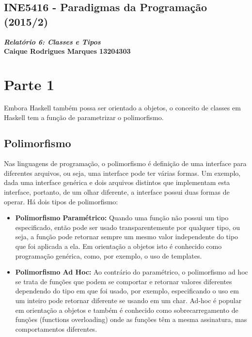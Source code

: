 \documentclass{article}
\begin{document}
\lstset{language=Haskell} %
\lstset{language=C++} %
\begin{center}
    \section*{INE5416 - Paradigmas da Programação (2015/2)}
    \textbf{\textit{Relatório 6: Classes e Tipos} \\
    Caique Rodrigues Marques 13204303}
\end{center}

\section*{Parte 1}
    Embora Haskell também possa ser orientado a objetos, o conceito de classes em Haskell tem a função de parametrizar o polimorfismo.

    \subsection*{Polimorfismo}
        Nas linguagens de programação, o polimorfismo é definição de uma interface para diferentes arquivos, ou seja, uma interface pode ter várias formas. Um exemplo, dada uma interface genérica e dois arquivos distintos que implementam esta interface, portanto, de um olhar diferente, a interface possui duas formas de operar. Há dois tipos de polimorfismo:
        \begin{itemize}
            \item \textbf{Polimorfismo Paramétrico: } Quando uma função não possui um tipo especificado, então pode ser usado transparentemente por qualquer tipo, ou seja, a função pode retornar sempre um mesmo valor independente do tipo que foi aplicada a ela. Em orientação a objetos isto é conhecido como programação genérica, como, por exemplo, o uso de templates.
            
            \item \textbf{Polimorfismo Ad Hoc:} Ao contrário do paramétrico, o polimorfismo ad hoc se trata de funções que podem se comportar e retornar valores diferentes dependendo do tipo em que foi usado, por exemplo, especificando o uso em um inteiro pode retornar diferente se usando em um char. Ad-hoc é popular em orientação a objetos e também é conhecido como sobrecarregamento de funções (functions overloading) onde as funções têm a mesma assinatura, mas comportamentos diferentes.
        \end{itemize}
        
\end{document}
